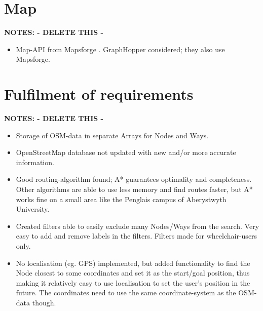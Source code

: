 \section{Map}
\textbf{NOTES: - DELETE THIS -}
\begin{itemize}
	\item Map-API from Mapsforge \cite{Mapsforge}. GraphHopper considered; they also use Mapsforge.
\end{itemize}




\section{Fulfilment of requirements}
\textbf{NOTES: - DELETE THIS -}
\begin{itemize}
	\item Storage of OSM-data in separate Arrays for Nodes and Ways.
	\item OpenStreetMap database not updated with new and/or more accurate information.
	\item Good routing-algorithm found; A* guarantees optimality and completeness. Other algorithms are able to use less memory and find routes faster, but A* works fine on a small area like the Penglais campus of Aberystwyth University.
	\item Created filters able to easily exclude many Nodes/Ways from the search. Very easy to add and remove labels in the filters. Filters made for wheelchair-users only.
	\item No localisation (eg. GPS) implemented, but added functionality to find the Node closest to some coordinates and set it as the start/goal position, thus making it relatively easy to use localisation to set the user's position in the future. The coordinates need to use the same coordinate-system as the OSM-data though.
\end{itemize}

